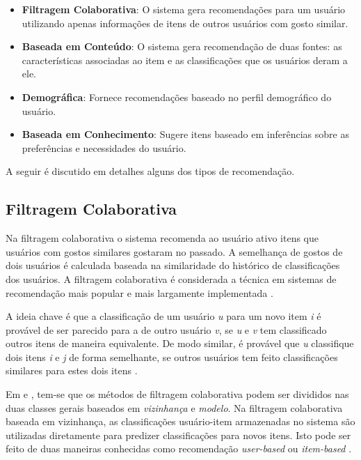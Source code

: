 \begin{itemize}
	\item{\textbf{Filtragem Colaborativa}: O sistema gera recomendações para um usuário utilizando apenas informações de itens de outros usuários com gosto similar.}
	
	\item{\textbf{Baseada em Conteúdo}: O sistema gera recomendação de duas fontes: as características associadas ao item e as classificações que os usuários deram a ele.}
	
	\item{\textbf{Demográfica}: Fornece recomendações baseado no perfil demográfico do usuário.}
	
	\item{\textbf{Baseada em Conhecimento}: Sugere itens baseado em inferências sobre as preferências e necessidades do usuário.}
\end{itemize}

	A seguir é discutido em detalhes alguns dos tipos de recomendação.
	
\subsection{Filtragem Colaborativa}
\label{subsec:cfRecSys}

Na filtragem colaborativa o sistema recomenda ao usuário ativo itens que usuários com gostos similares gostaram no passado. A semelhança de gostos de dois usuários é calculada baseada na similaridade do histórico de classificações dos usuários. A filtragem colaborativa é considerada a técnica em sistemas de recomendação mais popular e mais largamente implementada \citep{Ricci:2010:RSH:1941884}.

A ideia chave é que a classificação de um usuário \textit{u} para um novo item \textit{i} é provável de ser parecido para a de outro usuário \textit{v}, se \textit{u} e \textit{v} tem classificado outros itens de maneira equivalente. De modo similar, é provável que \textit{u} classifique dois itens \textit{i} e \textit{j} de forma semelhante, se outros usuários tem feito classificações similares para estes dois itens \citep{Ricci:2010:RSH:1941884}.

Em \cite{Burke2002} e \cite{Burke2007}, tem-se que os métodos de filtragem colaborativa podem ser divididos nas duas classes gerais baseados em \textit{vizinhança} e \textit{modelo}. Na filtragem colaborativa baseada em vizinhança, as classificações usuário-item armazenadas no sistema são utilizadas diretamente para predizer classificações para novos itens. Isto pode ser feito de duas maneiras conhecidas como recomendação \textit{user-based} ou \textit{item-based} \citep{Ricci:2010:RSH:1941884}.

